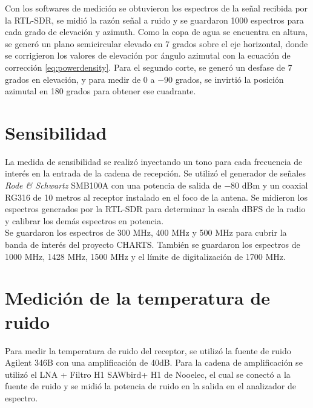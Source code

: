 Con los softwares de medición se obtuvieron los espectros de la señal recibida por la RTL-SDR, se midió la razón señal a ruido y se guardaron 1000 espectros para cada grado de elevación y azimuth. Como la copa de agua se encuentra en altura, se generó un plano semicircular elevado en 7 grados sobre el eje horizontal, donde se corrigieron los valores de elevación por ángulo azimutal con la ecuación de corrección \ref{eq:powerdensity}. Para el segundo corte, se generó un desfase de 7 grados en elevación, y para medir de 0 a $-90$ grados, se invirtió la posición azimutal en 180 grados para obtener ese cuadrante.\\


\section{Sensibilidad}

La medida de sensibilidad se realizó inyectando un tono para cada frecuencia de interés en la entrada de la cadena de recepción. Se utilizó el generador de señales \textit{Rode \& Schwartz} SMB100A con una potencia de salida de $-80$ dBm y un coaxial RG316 de 10 metros al receptor instalado en el foco de la antena. Se midieron los espectros generados por la RTL-SDR para determinar la escala dBFS de la radio y calibrar los demás espectros en potencia.\\

Se guardaron los espectros de 300 MHz, 400 MHz y 500 MHz para cubrir la banda de interés del proyecto CHARTS. También se guardaron los espectros de 1000 MHz, 1428 MHz, 1500 MHz y el límite de digitalización de 1700 MHz.\\

\section{Medición de la temperatura de ruido}

Para medir la temperatura de ruido del receptor, se utilizó la fuente de ruido Agilent 346B con una amplificación de 40dB. Para la cadena de amplificación se utilizó el LNA + Filtro H1 SAWbird+ H1 de Nooelec, el cual se conectó a la fuente de ruido y se midió la potencia de ruido en la salida en el analizador de espectro.\\

